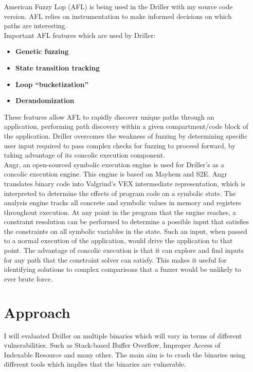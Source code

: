 \documentclass[a4paper, 11pt]{article}
\begin{document}
American Fuzzy Lop (AFL) is being used in the Driller with my source code version. AFL relies on instrumentation to make informed decisions on which paths are interesting.\\

Important AFL features which are used by Driller:
\begin{itemize}
	\item \textbf{Genetic fuzzing}
	\item \textbf{State transition tracking}
	\item \textbf{Loop ``bucketization''}
	\item \textbf{Derandomization}	
\end{itemize} 

These features allow AFL to rapidly discover unique paths through an application, performing path discovery within a given compartment/code block of the application. Driller overcomes the weakness of fuzzing by determining specific user input required to pass complex checks for fuzzing to proceed forward, by taking advantage of its concolic execution component.\\

Angr, an open-sourced symbolic execution engine is used for Driller’s as a concolic execution engine. This engine is based on Mayhem and S2E. Angr translates binary code into Valgrind’s VEX intermediate representation, which is interpreted to determine the effects of program code on a symbolic state. The analysis engine tracks all concrete and symbolic values in memory and registers throughout execution. At any point in the program that the engine reaches, a constraint resolution can be performed to determine a possible input that satisfies the constraints on all symbolic variables in the state. Such an input, when passed to a normal execution of the application, would drive the application to that point. The advantage of concolic execution is that it can explore and find inputs for any path that the constraint solver can satisfy. This makes it useful for identifying solutions to complex comparisons that a fuzzer would be unlikely to ever brute force.\\


\section*{Approach}

I will evaluated Driller on multiple binaries which will vary in terms of different vulnerabilities. Such as Stack-based Buffer Overflow, Improper Access of Indexable Resource and many other. The main aim is to crash the binaries using different tools which implies that the binaries are vulnerable.\\
\end{document}
